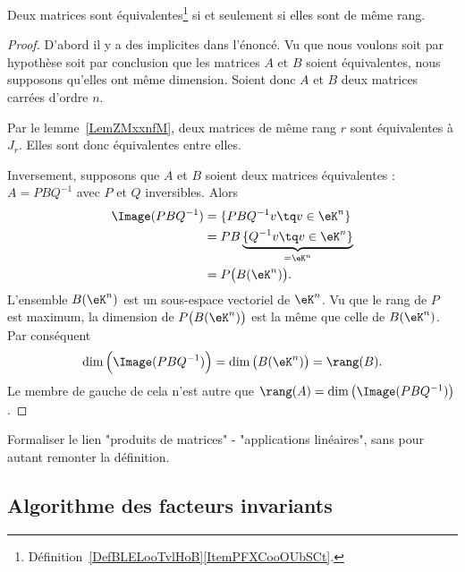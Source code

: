 \begin{corollary}      \label{CorGOUYooErfOIe}
    Deux matrices sont équivalentes\footnote{Définition~\ref{DefBLELooTvlHoB}\ref{ItemPFXCooOUbSCt}.} si et seulement si elles sont de même rang.
\end{corollary}

\begin{proof}
    D'abord il y a des implicites dans l'énoncé. Vu que nous voulons soit par hypothèse soit par conclusion que les matrices \( A\) et \( B\) soient équivalentes, nous supposons qu'elles ont même dimension. Soient donc \( A\) et \( B\) deux matrices carrées d'ordre \( n \).

    Par le lemme~\ref{LemZMxxnfM}, deux matrices de même rang \( r\) sont équivalentes à \( J_r\). Elles sont donc équivalentes entre elles.

    Inversement, supposons que \( A\) et \( B\) soient deux matrices équivalentes : \( A=PBQ^{-1}\) avec \( P\) et \( Q\) inversibles. Alors
    \begin{subequations}
        \begin{align}
            \Image(PBQ^{-1})&=\{ PBQ^{-1}v\tq v\in \eK^n \}\\
            &=PB\underbrace{\{ Q^{-1}v\tq v\in \eK^n \}}_{=\eK^n}\\
            &=P\big( B(\eK^n) \big).
        \end{align}
    \end{subequations}
    L'ensemble \( B(\eK^n)\) est un sous-espace vectoriel de \( \eK^n\). Vu que le rang de \( P\) est maximum, la dimension de \( P\big( B(\eK^n) \big)\) est la même que celle de \( B(\eK^n)\). Par conséquent
    \begin{equation}
        \dim\Big( \Image(PBQ^{-1}) \Big)=\dim\big( B(\eK^n) \big)=\rang(B).
    \end{equation}
    Le membre de gauche de cela n'est autre que \( \rang(A)=\dim\big( \Image(PBQ^{-1}) \big)\).
\end{proof}

\begin{probleme}        \label{PROPooVXNVooGWQEzM}
Formaliser le lien "produits de matrices" - "applications linéaires", sans pour autant remonter la définition. 
\end{probleme}

\subsection{Algorithme des facteurs invariants}

